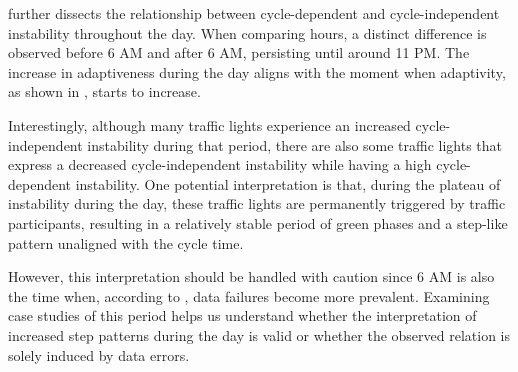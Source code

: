  further dissects the relationship between cycle-dependent and cycle-independent instability throughout the day. When comparing hours, a distinct difference is observed before 6 AM and after 6 AM, persisting until around 11 PM. The increase in adaptiveness during the day aligns with the moment when adaptivity, as shown in , starts to increase. 

Interestingly, although many traffic lights experience an increased cycle-independent instability during that period, there are also some traffic lights that express a decreased cycle-independent instability while having a high cycle-dependent instability. One potential interpretation is that, during the plateau of instability during the day, these traffic lights are permanently triggered by traffic participants, resulting in a relatively stable period of green phases and a step-like pattern unaligned with the cycle time.

However, this interpretation should be handled with caution since 6 AM is also the time when, according to , data failures become more prevalent. Examining case studies of this period helps us understand whether the interpretation of increased step patterns during the day is valid or whether the observed relation is solely induced by data errors.


